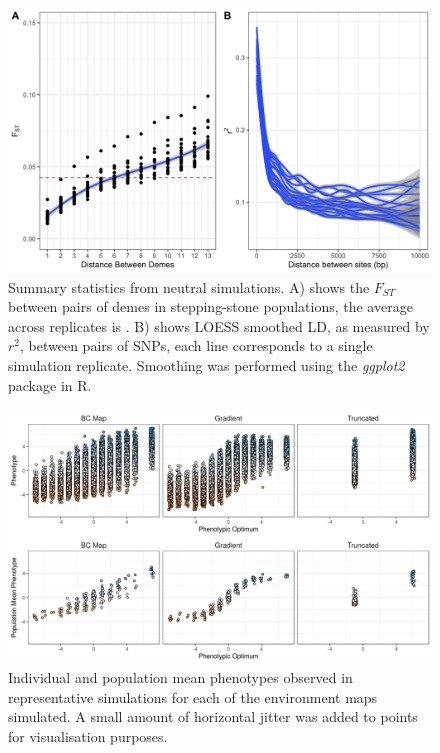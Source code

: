 \documentclass[10pt,twoside,lineno]{GSA_format}
\begin{document}
\pagebreak

\begin{figure}[H]
  \includegraphics[width=\textwidth,height=0.75\textheight,keepaspectratio]{../SimulationStudy/directionalSelection/SummaryStats.png}
  \caption{Summary statistics from neutral simulations. A) shows the $F_{ST}$ between pairs of demes in stepping-stone populations, the average across replicates is . B) shows LOESS smoothed LD, as measured by $r^2$, between pairs of SNPs, each line corresponds to a single simulation replicate. Smoothing was performed using the \textit{ggplot2} package in R.}

  \label{fig:summaryStats}
\end{figure}

\pagebreak

\begin{figure}[H]
  \includegraphics[width=\textwidth,height=0.75\textheight,keepaspectratio]{Plots/PhenotypePlot.png}
  \caption{Individual and population mean phenotypes observed in representative simulations for each of the environment maps simulated. A small amount of horizontal jitter was added to points for visualisation purposes.}

  \label{fig:localAdaptationPhenotypes}
\end{figure}
\end{document}
